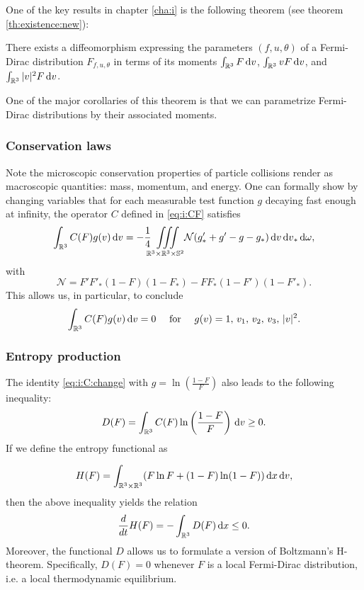 One of the key results in chapter \ref{cha:i} is the following theorem (see theorem \ref{th:existence:new}):

\begin{theorem*}
	There exists a diffeomorphism expressing the parameters $(f,u,\theta)$ of a Fermi-Dirac distribution $F_{f,u,\theta}$ in terms of its moments $\int_{{\mathbb {R}^3}} F{\,\mathrm{d} v}$, $\int_{{\mathbb {R}^3}} vF{\,\mathrm{d} v}$, and $\int_{{\mathbb {R}^3}} |v|^2F{\,\mathrm{d} v}$.
\end{theorem*}

 One of the major corollaries of this theorem is that we can parametrize Fermi-Dirac distributions by their associated moments.

\subsubsection{Conservation laws} %
\label{ssub:conservation_laws}
Note the microscopic conservation properties of particle collisions render as  macroscopic quantities: mass, momentum, and energy. One can formally show by changing variables that for each measurable test function $g$ decaying fast enough at infinity, the operator $C$ defined in \eqref{eq:i:CF} satisfies
	\begin{equation} \label{eq:i:C:change}
	 	\int_{{\mathbb R^3}}C(F)g(v){\,\mathrm{d} v} =-\frac{1}{4}{\iiint\limits_{\mathbb R^3\times\mathbb R^3\times\mathbb S^2}} \mathcal N (g'_*+g'-g-g_*) {\,\mathrm{d} v}{\,\mathrm{d} v}_*{\,\mathrm{d} \omega},
	 \end{equation}
with 
\[\mathcal N =F'F'_*(1-F)(1-F_*) -F F_*(1-F')(1-F'_*) .\]
% 
This allows us, in particular, to conclude
\[\int_{{\mathbb R^3}}C(F)g(v){\,\mathrm{d} v}=0\quad \mbox{ for }\quad g(v) = 1,\,v_1,\,v_2,\,v_3,\,|v|^2.\]

\subsubsection{Entropy production} %
\label{ssub:entropy_production}
The identity \eqref{eq:i:C:change} with $g=\ln\left(\frac{1-F}{F}\right)$ also leads to the following inequality:
\[D(F)=  \int_{{\mathbb {R}^3}} C(F)\ln \left(\frac{1-F}{F}\right){\,\mathrm{d} v} \ge 0.\]
If we define the entropy functional as

\[H(F) = \int_{{\mathbb {R}^3}\times {\mathbb {R}^3}} (F \ln F+ (1-F)\ln (1-F)){\,\mathrm{d} x}{\,\mathrm{d} v},\]
then the above inequality yields the relation
\[\frac{d}{dt}H(F) = - \int_{{\mathbb {R}^3}} D(F){\,\mathrm{d} x}\le 0.\]
Moreover, the functional $D$ allows us to formulate a version of Boltzmann's H-theorem. Specifically, $D(F)=0$ whenever $F$ is a local Fermi-Dirac distribution, i.e. a local thermodynamic equilibrium. 

